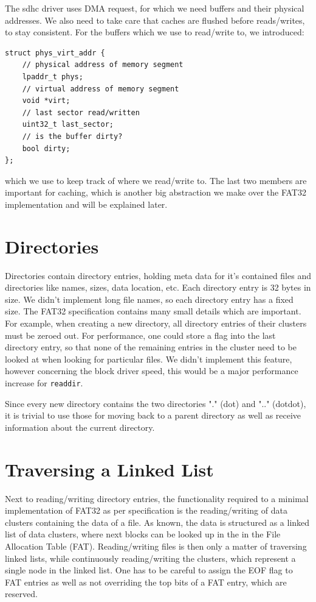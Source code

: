 The sdhc driver uses DMA request, for which we need buffers and their 
physical addresses. We also need to take care that caches are flushed
before reads/writes, to stay consistent.
For the buffers which we use to read/write to, we introduced:

\begin{verbatim}
struct phys_virt_addr {
    // physical address of memory segment
    lpaddr_t phys;
    // virtual address of memory segment
    void *virt;
    // last sector read/written
    uint32_t last_sector;
    // is the buffer dirty?
    bool dirty;
};
\end{verbatim}
which we use to keep track of where we read/write to.
The last two members are important for caching, which is another big abstraction we make over the FAT32 implementation
and will be explained later.

\section{Directories}
Directories contain directory entries, holding meta data for it's contained files and directories like names, sizes, data location, etc.
Each directory entry is 32 bytes in size. We didn't implement long file names, so each directory entry has a fixed size.
The FAT32 specification contains many small details which are important. For example, when creating a new directory, all directory entries
of their clusters must be zeroed out. For performance, one could store a flag into the last directory entry, so that none of the remaining
entries in the cluster need to be looked at when looking for particular files. We didn't implement this feature, however concerning the block 
driver speed, this would be a major performance increase for \texttt{readdir}.

Since every new directory contains the two directories "." (dot) and ".." (dotdot), it is trivial to use those for moving back to a parent directory
as well as receive information about the current directory. 

\section{Traversing a Linked List}
Next to reading/writing directory entries, the functionality required to a minimal implementation of FAT32 as per specification is the reading/writing of data clusters containing the data of a file. As known, the data is structured as a linked list of data clusters, where next blocks can be looked up in the 
in the File Allocation Table (FAT). Reading/writing files is then only a matter of traversing linked lists, while continuously reading/writing
the clusters, which represent a single node in the linked list. One has to be careful to assign the EOF flag to FAT entries as well as not overriding
the top bits of a FAT entry, which are reserved. 

